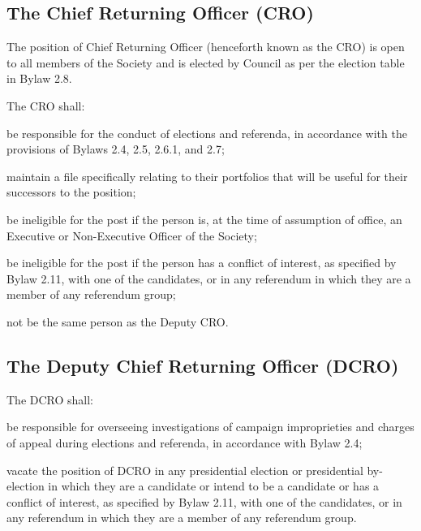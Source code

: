 \subsection {The Chief Returning Officer (CRO)}
\begin{longenum}[ label*=\thesubsection.\arabic*., align=left]
	\item The position of Chief Returning Officer (henceforth known as the CRO) is open to all members of the Society and is elected by Council as per the election table in Bylaw 2.8.
    \item The CRO shall: 
    \begin{longenum}[ label*=\arabic*., align=left]
		\item  be responsible for the conduct of elections and referenda, in accordance with the provisions of Bylaws 2.4, 2.5, 2.6.1, and 2.7; 
		\item maintain a file specifically relating to their portfolios that will be useful for their successors to the position; 
        \item be ineligible for the post if the person is, at the time of assumption of office, an Executive or Non-Executive Officer of the Society; 
        \item be ineligible for the post if the person has a conflict of interest, as specified by Bylaw 2.11, with one of the candidates, or in any referendum in which they are a member of any referendum group;
        \item not be the same person as the Deputy CRO.
        \end{longenum}
\end{longenum}

\subsection {The Deputy Chief Returning Officer (DCRO)} 
\begin{longenum}[ label*=\thesubsection.\arabic*., align=left]
	\item The DCRO shall: 
    \begin{longenum}[ label*=\arabic*., align=left]
		\item be responsible for overseeing investigations of campaign improprieties and charges of appeal during elections and referenda, in accordance with Bylaw 2.4;
        \item vacate the position of DCRO in any presidential election or presidential by-election in which they are a candidate or intend to be a candidate or has a conflict of interest, as specified by Bylaw 2.11, with one of the candidates, or in any referendum in which they are a member of any referendum group.
	\end{longenum}    
\end{longenum}
